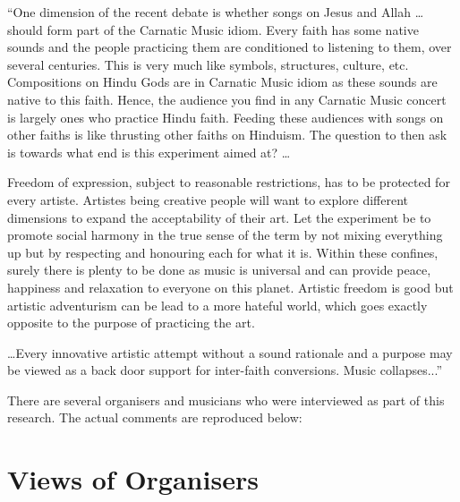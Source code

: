 \begin{myquote}
“One dimension of the recent debate is whether songs on Jesus and Allah … should form part of the Carnatic Music idiom. Every faith has some native sounds and the people practicing them are conditioned to listening to them, over several centuries. This is very much like symbols, structures, culture, etc. Compositions on Hindu Gods are in Carnatic Music idiom as these sounds are native to this faith. Hence, the audience you find in any Carnatic Music concert is largely ones who practice Hindu faith. Feeding these audiences with songs on other faiths is like thrusting other faiths on Hinduism. The question to then ask is towards what end is this experiment aimed at? …
\end{myquote}

\begin{myquote}
Freedom of expression, subject to reasonable restrictions, has to be protected for every artiste. Artistes being creative people will want to explore different dimensions to expand the acceptability of their art. Let the experiment be to promote social harmony in the true sense of the term by not mixing everything up but by respecting and honouring each for what it is. Within these confines, surely there is plenty to be done as music is universal and can provide peace, happiness and relaxation to everyone on this planet. Artistic freedom is good but artistic adventurism can be lead to a more hateful world, which goes exactly opposite to the purpose of practicing the art.
\end{myquote}

\begin{myquote}
…Every innovative artistic attempt without a sound rationale and a purpose may be viewed as a back door support for inter-faith conversions. Music collapses...”
\end{myquote}

There are several organisers and musicians who were interviewed as part of this research. The actual comments are reproduced below:

\vspace{-.4cm}

\section*{Views of Organisers}

